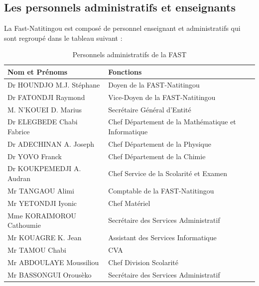 \documentclass[a4paper,12pt]{report}
\theoremstyle{definition}
\begin{document}
	\subsection{Les personnels administratifs et enseignants}
	La Fast-Natitingou est composé de personnel enseignant et administratifs qui sont regroupé dans le tableau suivant :
	\begin{table}[h]
		\centering
		\begin{tabular}{|l|l|}
			\hline
			\textbf{Nom et Prénoms} & \textbf{Fonctions}\\
			\hline
			Dr HOUNDJO M.J. Stéphane &  Doyen de la FAST-Natitingou\\
			\hline
			Dr FATONDJI Raymond &  Vice-Doyen de la FAST-Natitingou\\
			\hline
			M. N’KOUEI D. Marius &  Secrétaire Général d’Entité\\
			\hline
			Dr ELEGBEDE Chabi Fabrice & Chef Département de la Mathématique et Informatique\\
			\hline
			Dr ADECHINAN A. Joseph & Chef Département de la Physique\\
			\hline
			Dr YOVO Franck & Chef Département de la Chimie\\
			\hline
			Dr KOUKPEMEDJI A. Audran & Chef Service de la Scolarité et Examen\\
			\hline
			Mr TANGAOU Alimi & Comptable de la FAST-Natitingou\\
			\hline
			Mr YETONDJI Iyonic & Chef Matériel\\
			\hline
			Mme KORAIMOROU Cathoumie & Secrétaire des Services Administratif\\
			\hline
			Mr KOUAGRE K. Jean & Assistant des Services Informatique\\
			\hline
			Mr TAMOU Chabi & CVA\\
			\hline
			Mr ABDOULAYE Moussiliou & Chef Division Scolarité\\
			\hline
			Mr BASSONGUI Orousèko & Secrétaire des Services Administratif\\
			\hline
		\end{tabular}
		\caption{Personnels administratifs de la FAST}
	\end{table}
\end{document}
